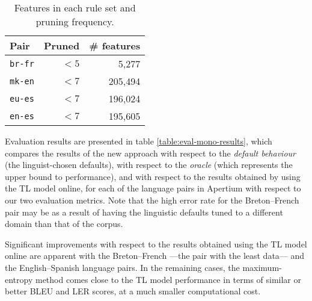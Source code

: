\documentclass[11pt]{article}
\newcommand{\comment}[1]{\todo{#1}}
\begin{document}
\begin{table}
 \begin{center}
    \begin{tabular}{|l|r|r|}
        \hline
        \textbf{Pair} & \textbf{Pruned} & \textbf{\# features} \\
        \hline
        {\tt br-fr}  & $< 5$              & 5,277    \\ 
        \hline
        {\tt mk-en} & $< 7$              & 205,494 \\ 
        \hline
        {\tt eu-es} & $< 7$              & 196,024\\
        \hline
        {\tt en-es} & $< 7$              & 195,605\\
        \hline
    \end{tabular}
 \end{center}
 \caption{Features in each rule set and pruning frequency.}
 \label{table:maxent-features}
\end{table}


 Evaluation results are presented in 
 table \ref{table:eval-mono-results}, which compares the results of
 the new approach with respect to the \emph{default behaviour} (the
 linguist-chosen defaults), with respect to the \emph{oracle} (which
 represents the upper bound to performance), and with respect to the
 results obtained by using the TL model online, for each of the
 language pairs in Apertium with respect to our two evaluation
 metrics. Note that the high error rate for the Breton--French pair
 may be as a result of having the linguistic defaults tuned to a
 different domain than that of the corpus.

 Significant improvements with respect to the results obtained using
 the TL model online are apparent with the Breton--French ---the pair
 with the least data--- and the English--Spanish language pairs. In
 the remaining cases, the maximum-entropy method comes close to the TL
 model performance in terms of similar or better BLEU and LER scores,
 at a much smaller computational cost.


\end{document}
